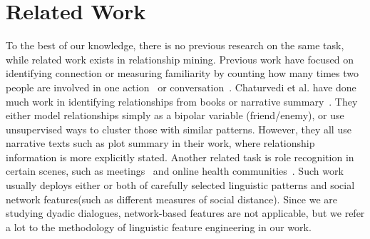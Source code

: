 \section{Related Work}
\label{se:related}

To the best of our knowledge, there is no previous research on the same task,
while related work exists in relationship mining.
Previous work have focused on
identifying connection or measuring familiarity by counting
how many times two people are involved in one action~\cite{relation-act}
or conversation~\cite{relation-conver}.
Chaturvedi et al. have done much work in identifying relationships
from books or narrative summary~\cite{rel-mining-1,rel-mining-2,rel-mining-3}.
They either model relationships simply as a bipolar variable (friend/enemy), or use
unsupervised ways to cluster those with similar patterns. However, they all use
narrative texts such as plot summary in their work, where relationship information
is more explicitly stated. Another related task is role recognition in certain scenes,
such as meetings~\cite{role1} and online health communities~\cite{role2}. Such work
usually deploys either or both of carefully selected linguistic patterns and social network
features(such as different measures of social distance). Since we are studying
dyadic dialogues, network-based features are not applicable, but we refer a
lot to the methodology of linguistic feature engineering in our work.

